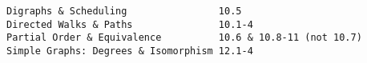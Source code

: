\documentclass[handout]{mcs}
\begin{document}
\renewcommand{\reading}{
  \begin{itemize}
  \end{itemize}
}


\begin{staffnotes}
\begin{verbatim}
Digraphs & Scheduling                10.5
Directed Walks & Paths               10.1-4
Partial Order & Equivalence          10.6 & 10.8-11 (not 10.7)
Simple Graphs: Degrees & Isomorphism 12.1-4 
\end{verbatim}
\end{staffnotes}


\end{document}
